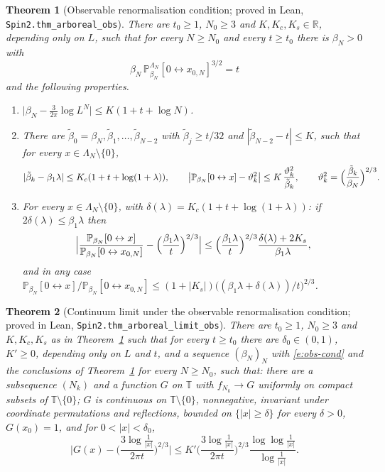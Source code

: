 \documentclass[11pt]{amsart}
\newtheorem{theorem}{Theorem}[section]
\theoremstyle{definition}
\theoremstyle{remark}
\numberwithin{equation}{section}
\newcommand{\R}{\mathbb{R}}
\newcommand{\T}{\mathbb{T}}
\newcommand{\conn}{\leftrightarrow}
\begin{document}
\begin{theorem}[Observable renormalisation condition; proved in Lean, \texttt{Spin2.thm\_arboreal\_obs}]\label{thm:obs}
There are $t_0\ge1$, $N_0\ge3$ and $K,K_c,K_s\in\R$, depending only on $L$, such that for every $N\ge N_0$ and every
$t\ge t_0$ there is $\beta_N>0$ with
\begin{equation}\label{e:obs-cond}
  \beta_N\,\mathbb{P}^{\Lambda_N}_{\beta_N}[0\conn x_{0,N}]^{3/2}=t
\end{equation}
and the following properties.
\begin{enumerate}[label=(\roman*)]
\item $\bigl|\beta_N-\frac3{2\pi}\log L^N\bigr|\le K(1+t+\log N)$.
\item There are $\tilde\beta_0=\beta_N,\tilde\beta_1,\dots,\tilde\beta_{N-2}$ with $\tilde\beta_j\ge t/32$ and
$|\tilde\beta_{N-2}-t|\le K$, such that for every $x\in\Lambda_N\setminus\{0\}$,
\begin{equation}
  |\tilde\beta_k-\beta_1\lambda|\le K_c(1+t+\log(1+\lambda)),\qquad
  \bigl|\mathbb{P}_{\beta_N}[0\conn x]-\vartheta_k^2\bigr|\le K\,\frac{\vartheta_k^2}{\tilde\beta_k},\qquad
  \vartheta_k^2=\Bigl(\frac{\tilde\beta_k}{\beta_N}\Bigr)^{2/3}.
\end{equation}
\item For every $x\in\Lambda_N\setminus\{0\}$, with $\delta(\lambda)=K_c(1+t+\log(1+\lambda))$: if
$2\delta(\lambda)\le\beta_1\lambda$ then
\begin{equation}
  \Bigl|\frac{\mathbb{P}_{\beta_N}[0\conn x]}{\mathbb{P}_{\beta_N}[0\conn x_{0,N}]}-\Bigl(\frac{\beta_1\lambda}{t}\Bigr)^{2/3}\Bigr|
  \le\Bigl(\frac{\beta_1\lambda}{t}\Bigr)^{2/3}\frac{\delta(\lambda)+2K_s}{\beta_1\lambda},
\end{equation}
and in any case
$\mathbb{P}_{\beta_N}[0\conn x]/\mathbb{P}_{\beta_N}[0\conn x_{0,N}]\le(1+|K_s|)\bigl((\beta_1\lambda+\delta(\lambda))/t\bigr)^{2/3}$.
\end{enumerate}
\end{theorem}

\begin{theorem}[Continuum limit under the observable renormalisation condition; proved in Lean, \texttt{Spin2.thm\_arboreal\_limit\_obs}]\label{thm:limit-obs}
There are $t_0\ge1$, $N_0\ge3$ and $K,K_c,K_s$ as in Theorem~\ref{thm:obs} such that for every $t\ge t_0$ there are
$\delta_0\in(0,1)$, $K'\ge0$, depending only on $L$ and $t$, and a sequence $(\beta_N)_N$ with
\eqref{e:obs-cond} and the conclusions of Theorem~\ref{thm:obs} for every $N\ge N_0$, such that:
there are a subsequence $(N_k)$ and a function $G$ on $\T$ with $f_{N_k}\to G$ uniformly on compact subsets of
$\T\setminus\{0\}$; $G$ is continuous on $\T\setminus\{0\}$, nonnegative, invariant under coordinate permutations
and reflections, bounded on $\{|x|\ge\delta\}$ for every $\delta>0$, $G(x_0)=1$, and for $0<|x|<\delta_0$,
\begin{equation}
    \Biggl|G(x)-\Biggl(\frac{3\log\frac1{|x|}}{2\pi t}\Biggr)^{2/3}\Biggr|
    \le K'\Biggl(\frac{3\log\frac1{|x|}}{2\pi t}\Biggr)^{2/3}\frac{\log\log\frac1{|x|}}{\log\frac1{|x|}}.
\end{equation}
\end{theorem}
\end{document}

